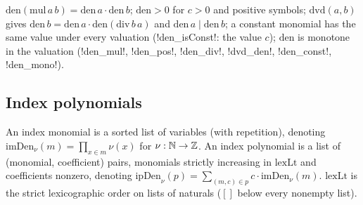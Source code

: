 \begin{proposition}
$\mathrm{den}(\mathrm{mul}\,a\,b)=\mathrm{den}\,a\cdot\mathrm{den}\,b$; $\mathrm{den}>0$ for $c>0$ and positive symbols; $\mathrm{dvd}(a,b)$ gives $\mathrm{den}\,b=\mathrm{den}\,a\cdot\mathrm{den}(\mathrm{div}\,b\,a)$ and $\mathrm{den}\,a\mid\mathrm{den}\,b$; a constant monomial has the same value under every valuation (\lean!den_isConst!: the value $c$); $\mathrm{den}$ is monotone in the valuation (\lean!den_mul!, \lean!den_pos!, \lean!den_div!, \lean!dvd_den!, \lean!den_const!, \lean!den_mono!).
\end{proposition}

\subsection{Index polynomials}

\begin{definition}
An index monomial is a sorted list of variables (with repetition), denoting $\mathrm{imDen}_\nu(m)=\prod_{x\in m}\nu(x)$ for $\nu:\mathbb{N}\to\mathbb{Z}$. An index polynomial is a list of (monomial, coefficient) pairs, monomials strictly increasing in $\mathrm{lexLt}$ and coefficients nonzero, denoting $\mathrm{ipDen}_\nu(p)=\sum_{(m,c)\in p}c\cdot\mathrm{imDen}_\nu(m)$. $\mathrm{lexLt}$ is the strict lexicographic order on lists of naturals ($[]$ below every nonempty list).
\end{definition}

